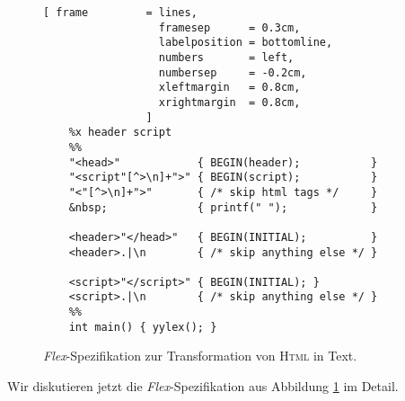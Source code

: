 \begin{figure}[!h]
\centering
\begin{Verbatim}[ frame         = lines, 
                  framesep      = 0.3cm, 
                  labelposition = bottomline,
                  numbers       = left,
                  numbersep     = -0.2cm,
                  xleftmargin   = 0.8cm,
                  xrightmargin  = 0.8cm,
                ]
    %x header script
    %%
    "<head>"            { BEGIN(header);           }
    "<script"[^>\n]+">" { BEGIN(script);           }
    "<"[^>\n]+">"       { /* skip html tags */     }
    &nbsp;              { printf(" ");             }
    
    <header>"</head>"   { BEGIN(INITIAL);          }
    <header>.|\n        { /* skip anything else */ }
    
    <script>"</script>" { BEGIN(INITIAL); }
    <script>.|\n        { /* skip anything else */ }
    %%
    int main() { yylex(); }
\end{Verbatim}
\vspace*{-0.3cm}
\caption{\textsl{Flex}-Spezifikation zur Transformation von \textsc{Html} in Text.}
\label{fig:html2txt}
\end{figure}
\noindent
Wir diskutieren jetzt die \textsl{Flex}-Spezifikation aus Abbildung \ref{fig:html2txt} im
Detail.
